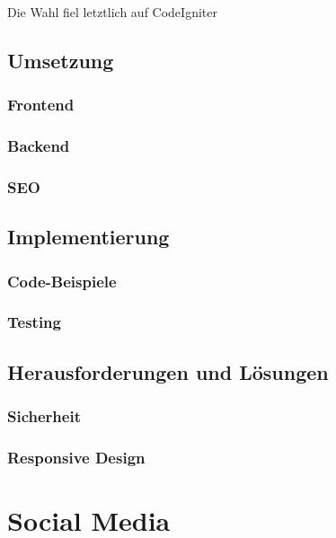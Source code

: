     Die Wahl fiel letztlich auf CodeIgniter
  \subsection{Umsetzung}

    \subsubsection{Frontend}

    \subsubsection{Backend}

    \subsubsection{SEO}

  \subsection{Implementierung}

    \subsubsection{Code-Beispiele}

    \subsubsection{Testing}

  \subsection{Herausforderungen und Lösungen}

    \subsubsection{Sicherheit}

    \subsubsection{Responsive Design}

\section{Social Media}
\textcolor{red}{\blindtext}
